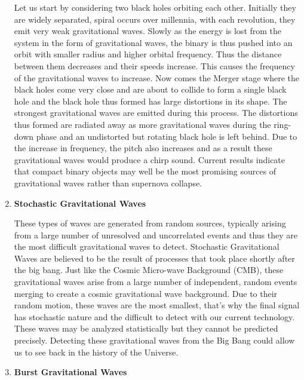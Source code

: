 \begin{enumerate}
\vspace{1mm}
Let us start by considering two black holes orbiting each other. Initially they are widely separated, spiral occurs over millennia, with each revolution, they emit very weak gravitational waves. Slowly as the energy is lost from the system in the form of gravitational waves, the binary is thus pushed into an orbit with smaller radius and higher orbital frequency. Thus the distance between them decreases and their speeds increase. This causes the frequency of the gravitational waves to increase. Now comes the Merger stage where the black holes come very close and are about to collide to form a single black hole and the black hole thus formed has large distortions in its shape. The strongest gravitational waves are emitted during this process. The distortions thus formed are radiated away as more gravitational waves during the ring-down phase and an undistorted but rotating black hole is left behind. Due to the increase in frequency, the pitch also increases and as a result these gravitational waves would produce a chirp sound. Current results indicate that compact binary objects may well be the most promising sources of gravitational waves rather than supernova collapse.

\item \textbf{Stochastic Gravitational Waves}

These types of waves are generated from random sources, typically arising from a large number of unresolved and uncorrelated events and thus they are the most difficult gravitational waves to detect. Stochastic Gravitational Waves are believed to be the result of processes that took place shortly after the big bang. Just like the Cosmic Micro-wave Background (CMB), these gravitational waves arise from a large number of independent, random events merging to create a cosmic gravitational wave background. Due to their random motion, these waves are the most smallest, that's why the final signal has stochastic nature and the difficult to detect with our current technology. These waves may be analyzed statistically but they cannot be predicted precisely. Detecting these gravitational waves from the Big Bang could allow us to see back in the history of the Universe.

\vspace{0.2cm}

\item \textbf{Burst Gravitational Waves}   


\end{enumerate}
